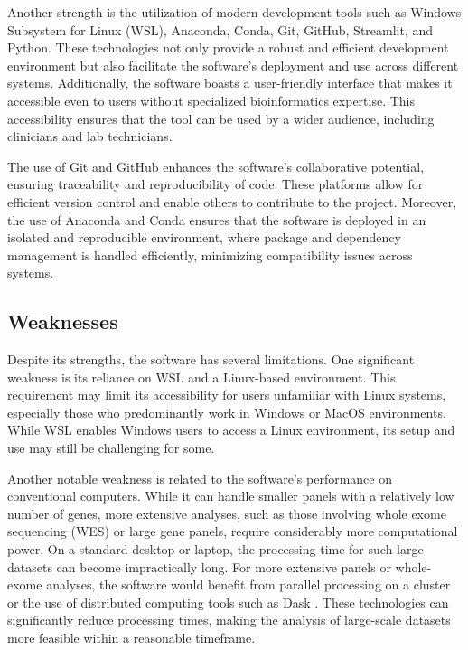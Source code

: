 Another strength is the utilization of modern development tools such as Windows Subsystem for Linux (WSL), Anaconda, Conda, Git, GitHub, Streamlit, and Python. These technologies not only provide a robust and efficient development environment but also facilitate the software's deployment and use across different systems. Additionally, the software boasts a user-friendly interface that makes it accessible even to users without specialized bioinformatics expertise. This accessibility ensures that the tool can be used by a wider audience, including clinicians and lab technicians.

The use of Git and GitHub enhances the software's collaborative potential, ensuring traceability and reproducibility of code. These platforms allow for efficient version control and enable others to contribute to the project. Moreover, the use of Anaconda and Conda ensures that the software is deployed in an isolated and reproducible environment, where package and dependency management is handled efficiently, minimizing compatibility issues across systems.

\subsection{Weaknesses}

Despite its strengths, the software has several limitations. One significant weakness is its reliance on WSL and a Linux-based environment. This requirement may limit its accessibility for users unfamiliar with Linux systems, especially those who predominantly work in Windows or MacOS environments. While WSL enables Windows users to access a Linux environment, its setup and use may still be challenging for some.

Another notable weakness is related to the software's performance on conventional computers. While it can handle smaller panels with a relatively low number of genes, more extensive analyses, such as those involving whole exome sequencing (WES) or large gene panels, require considerably more computational power. On a standard desktop or laptop, the processing time for such large datasets can become impractically long. For more extensive panels or whole-exome analyses, the software would benefit from parallel processing on a cluster or the use of distributed computing tools such as Dask \cite{dask}. These technologies can significantly reduce processing times, making the analysis of large-scale datasets more feasible within a reasonable timeframe.

